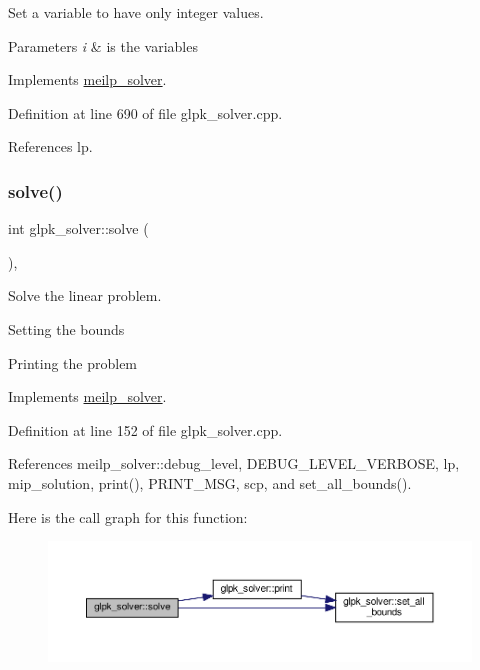 Set a variable to have only integer values. 


\begin{DoxyParams}{Parameters}
{\em i} & is the variables \\
\hline
\end{DoxyParams}


Implements \hyperlink{classmeilp__solver_aa9d0154f8daf67a0d815b76c6739546a}{meilp\+\_\+solver}.



Definition at line 690 of file glpk\+\_\+solver.\+cpp.



References lp.

\mbox{\label{classglpk__solver_ab9787b0a1b68144bfd68fbf95a61ad51}} 
\subsubsection{\texorpdfstring{solve()}{solve()}}
{\footnotesize\ttfamily int glpk\+\_\+solver\+::solve (\begin{DoxyParamCaption}{ }\end{DoxyParamCaption})\hspace{0.3cm}{\ttfamily [override]}, {\ttfamily [virtual]}}



Solve the linear problem. 

Setting the bounds

Printing the problem 

Implements \hyperlink{classmeilp__solver_ac042de10d65f792cc6ef6020b8451837}{meilp\+\_\+solver}.



Definition at line 152 of file glpk\+\_\+solver.\+cpp.



References meilp\+\_\+solver\+::debug\+\_\+level, D\+E\+B\+U\+G\+\_\+\+L\+E\+V\+E\+L\+\_\+\+V\+E\+R\+B\+O\+SE, lp, mip\+\_\+solution, print(), P\+R\+I\+N\+T\+\_\+\+M\+SG, scp, and set\+\_\+all\+\_\+bounds().

Here is the call graph for this function\+:
\nopagebreak
\begin{figure}[H]
\begin{center}
\leavevmode
\includegraphics[width=350pt]{db/d0a/classglpk__solver_ab9787b0a1b68144bfd68fbf95a61ad51_cgraph}
\end{center}
\end{figure}
\mbox{\label{classglpk__solver_ad27b82487380811e19a1adc2628f8b07}} 
